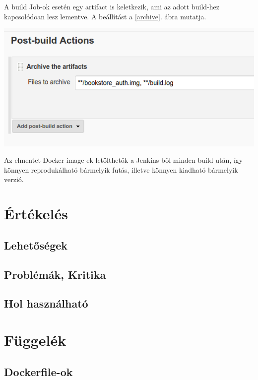 \documentclass[11pt,magyar,a4paper,twoside,]{report}
\let\Oldincludegraphics\includegraphics
\renewcommand{\includegraphics}[1]{
\begin{adjustbox}{max size={\textwidth}{\textheight}}
    \Oldincludegraphics[scale=0.6]{#1}%
\end{adjustbox}
}
\begin{document}
A build Job-ok esetén egy artifact is keletkezik, ami az adott build-hez
kapcsolódoan lesz lementve. A beállítást a \ref{archive}. ábra mutatja.

\includegraphics{img/archive.png}\label{archive}

Az elmentet Docker image-ek letölthetők a Jenkins-ből minden build után,
így könnyen reprodukálható bármelyik futás, illetve könnyen kiadható
bármelyik verzió.

\chapter{Értékelés}\label{uxe9rtuxe9keluxe9s}

\section{Lehetőségek}\label{lehetux151suxe9gek}

\section{Problémák, Kritika}\label{probluxe9muxe1k-kritika}

\section{Hol használható}\label{hol-hasznuxe1lhatuxf3}

\listoftables
\listoffigures




\appendix

\chapter{Függelék}\label{fuxfcggeluxe9k}

\section{\texorpdfstring{Dockerfile-ok\label{appendix-dockerfile}}{Dockerfile-ok}}\label{dockerfile-ok}
\end{document}
